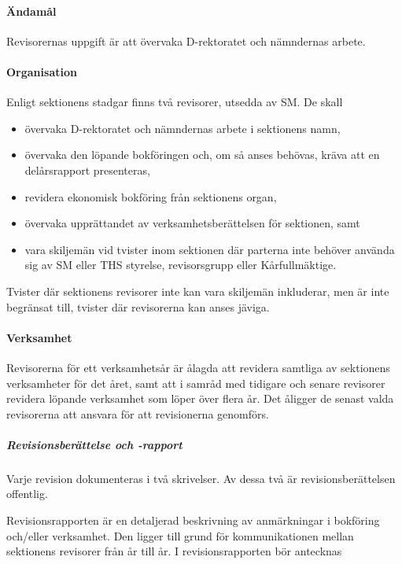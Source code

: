 \documentclass{dgovdoc}
\begin{document}
\paragraph{Ändamål}

Revisorernas uppgift är att övervaka D-rektoratet och nämndernas arbete.

\paragraph{Organisation}

Enligt sektionens stadgar finns två revisorer, utsedda av SM. De skall

\begin{itemize}
  \item övervaka D-rektoratet och nämndernas arbete i sektionens namn,
  \item övervaka den löpande bokföringen och, om så anses behövas, kräva att en
    delårsrapport presenteras,
  \item revidera ekonomisk bokföring från sektionens organ,
  \item övervaka upprättandet av verksamhetsberättelsen för sektionen, samt
  \item vara skiljemän vid tvister inom sektionen där parterna inte behöver
    använda sig av SM eller THS styrelse, revisorsgrupp eller Kårfullmäktige.
\end{itemize}

Tvister där sektionens revisorer inte kan vara skiljemän inkluderar, men är
inte begränsat till, tvister där revisorerna kan anses jäviga.

\paragraph{Verksamhet}

Revisorerna för ett verksamhetsår är ålagda att revidera samtliga av sektionens
verksamheter för det året, samt att i samråd med tidigare och senare revisorer
revidera löpande verksamhet som löper över flera år. Det åligger de senast
valda revisorerna att ansvara för att revisionerna genomförs.

\subparagraph{Revisionsberättelse och -rapport}

Varje revision dokumenteras i två skrivelser. Av dessa två är
revisionsberättelsen offentlig.

Revisionsrapporten är en detaljerad beskrivning av anmärkningar i bokföring
och/eller verksamhet. Den ligger till grund för kommunikationen mellan
sektionens revisorer från år till år. I
revisionsrapporten bör antecknas
\end{document}
